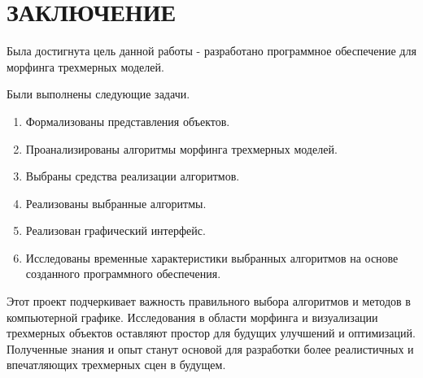\chapter*{ЗАКЛЮЧЕНИЕ}

Была достигнута цель данной работы - разработано программное обеспечение для морфинга трехмерных моделей.

Были выполнены следующие задачи.
\begin{enumerate}
	\item Формализованы представления объектов.
	\item Проанализированы алгоритмы морфинга трехмерных моделей.
	\item Выбраны средства реализации алгоритмов.
	\item Реализованы выбранные алгоритмы.
	\item Реализован графический интерфейс.
	\item Исследованы временные характеристики выбранных алгоритмов на основе созданного программного обеспечения.
\end{enumerate}


Этот проект подчеркивает важность правильного выбора алгоритмов и методов в компьютерной графике. Исследования в области морфинга и визуализации трехмерных объектов оставляют простор для будущих улучшений и оптимизаций. Полученные знания и опыт станут основой для разработки более реалистичных и впечатляющих трехмерных сцен в будущем.